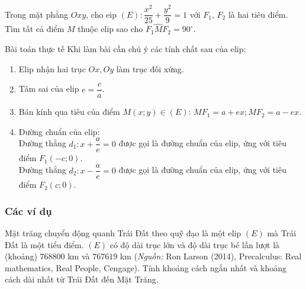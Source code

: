 \begin{bt}%
Trong mặt phẳng $Oxy$, cho eip $(E)\colon \dfrac{x^2}{25}+\dfrac{y^2}{9}=1$ với $F_1$, $F_2$ là hai tiêu điểm. Tìm tất cả điểm $M$ thuộc elip sao cho $\widehat{F_1MF_2}=90^\circ$.
\end{bt}

\begin{dang}{Bài toán thực tế}
	Khi làm bài cần chú ý các tính chất sau của elip:
\begin{enumerate}
	\item Elip nhận hai trục $Ox,Oy$ làm trục đối xứng. 
	\item Tâm sai của elip $e=\dfrac{c}{a}$.
	\item Bán kính qua tiêu của điểm $M(x;y)\in (E)$: $MF_1=a+ex; MF_2=a-ex$.
	\item Đường chuẩn của elip:\\Đường thẳng $d_1: x+\dfrac{a}{e}=0$ được gọi là đường chuẩn của elip, ứng với tiêu điểm $F_1(-c;0)$.\\Đường thẳng $d_2: x-\dfrac{a}{e}=0$ được gọi là đường chuẩn của elip, ứng với tiêu điểm $F_2(c;0).$      
\end{enumerate}	
\end{dang}

\subsubsection{Các ví dụ}
\begin{vd}%
Mặt trăng chuyển động quanh Trái Đất theo quỹ đạo là một elip $(E)$ mà Trái Đất là một tiểu điểm. $(E)$ có độ dài trục lớn và độ dài trục bé lần lượt là (khoảng) $768800$ km và $767619$ km (\textit{Nguồn:} Ron Larson (2014), Precalculus: Real mathematics, Real People, Cengage). Tính khoảng cách ngắn nhất và khoảng cách dài nhất từ Trái Đất đến Mặt Trăng.
\end{vd}

